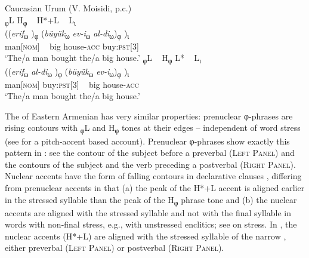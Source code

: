 \documentclass[output=paper,colorlinks,citecolor=brown]{langscibook}
\begin{document}
\ea \label{ex:urumNarrow}
    Caucasian Urum (V. Moisidi, p.c.) \\
    \ea 
        \glll \textup{\textsubscript{φ}L} \textup{H\textsubscript{φ}} ~ \textup{H*+L} ~ \textup{L\textsubscript{ι}} \\
            ((\textit{erif}\textsubscript{ω} )\textsubscript{φ} (\textit{büyük}\textsubscript{ω} \textit{ev-i}\textsubscript{ω}  \textit{al-di}\textsubscript{ω})\textsubscript{φ} )\textsubscript{ι}\\
            man\textsc{[nom]} ~ big house-\textsc{acc} buy:\textsc{pst[3]}\\
            \glt ‘The/a man bought the/a big house.’
    \ex 
        \glll \textup{\textsubscript{φ}L} ~  \textup{H\textsubscript{φ}} \hspace{0.6cm}\textup{L*} ~ \textup{L\textsubscript{ι}} \\
            ((\textit{erif}\textsubscript{ω} \textit{al-di}\textsubscript{ω} )\textsubscript{φ} (\textit{büyük}\textsubscript{ω} \textit{ev-i}\textsubscript{ω})\textsubscript{φ} )\textsubscript{ι}\\
            man\textsc{[nom]} buy:\textsc{pst[3]} ~ big house-\textsc{acc}\\
            \glt ‘The/a man bought the/a big house.’
    \z
\z

The  of Eastern Armenian has very similar properties: prenuclear φ-phrases are rising contours with \textsubscript{φ}L and H\textsubscript{φ} tones at their edges -- independent of word stress (see \citealt[61--81]{toparlak_etudes_2019} for a pitch-accent based account). Prenuclear φ-phrases show exactly this pattern in : see the contour of the subject before a preverbal  (\textsc{Left Panel}) and the contours of the subject and the verb preceding a postverbal  (\textsc{Right Panel}). Nuclear accents have the form of falling contours in declarative clauses \citep[53]{dum-tragut_armenian_2009}{}, differing from prenuclear accents in that (a) the peak of the H*+L accent is aligned earlier in the stressed syllable than the peak of the H\textsubscript{φ} phrase tone and (b) the nuclear accents are aligned with the stressed syllable and not with the final syllable in words with non-final stress, e.g., with unstressed enclitics; see \citet[864]{dolatian_cyclicity_2020} on stress. In , the nuclear accents (H*+L) are aligned with the stressed syllable of the narrow , either preverbal (\textsc{Left Panel}) or postverbal (\textsc{Right Panel}).
\end{document}
